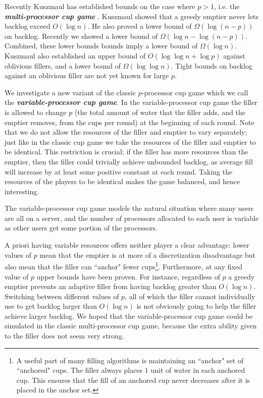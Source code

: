 \documentclass[twocolumn]{article}[10pt]
\newcommand{\defn}[1]{{\textit{\textbf{\boldmath #1}}}\xspace}
\renewcommand{\paragraph}[1]{\vspace{0.09in}\noindent{\bf \boldmath #1.}}
\begin{document}
Recently Kuszmaul has established bounds on the case where $p>1$, i.e. the
\defn{multi-processor cup game} \cite{wku20}. Kuszmaul showed that a greedy
emptier never lets backlog exceed $O(\log n)$. He also proved a lower bound of
$\Omega(\log (n-p))$ on backlog. Recently we showed a lower bound of
$\Omega(\log n - \log (n-p))$. Combined, these lower bounds bounds imply a
lower bound of $\Omega(\log n)$. Kuszmaul also established an upper bound of
$O(\log\log n + \log p)$ against oblivious fillers, and a lower bound of
$\Omega(\log\log n)$. Tight bounds on backlog against an oblivious
filler are not yet known for large $p$.

\paragraph{The Variable-Processor Cup Game}
We investigate a new variant of the classic $p$-processor cup game which we call
the \defn{variable-processor cup game}. In the variable-processor cup game the
filler is allowed to change $p$ (the total amount of water that the filler
adds, and the emptier removes, from the cups per round) at the beginning of
each round. Note that we do not allow the resources of the filler and emptier
to vary separately; just like in the classic cup game we take the resources of
the filler and emptier to be identical.
This restriction is crucial; if
the filler has more resources than the emptier, then
the filler could trivially achieve unbounded backlog, as average fill will
increase by at least some positive constant at each round.
Taking the resources of the players to be identical makes the game balanced,
and hence interesting.

The variable-processor cup game models the natural situation
where many users are all on a server, and the number of
processors allocated to each user is variable as other users get
some portion of the processors.

A priori having variable resources offers neither player a clear advantage:
lower values of $p$ mean that the emptier is at more of a discretization
disadvantage but also mean that the filler can ``anchor" fewer cups\footnote{A
useful part of many filling algorithms is maintaining an ``anchor" set of
``anchored" cups. The filler always places $1$ unit of water in each anchored
cup. This ensures that the fill of an anchored cup never decreases after it is
placed in the anchor set.}. Furthermore, at any fixed value of $p$ upper bounds
have been proven. For instance, regardless of $p$ a greedy emptier prevents an
adaptive filler from having backlog greater than $O(\log n)$. Switching between
different values of $p$, all of which the filler cannot individually use to get
backlog larger than $O(\log n)$ is not obviously going to help
the filler achieve larger backlog. We hoped that the
variable-processor cup game could be simulated in the classic
multi-processor cup game, because the extra ability given to the
filler does not seem very strong. 
\end{document}
